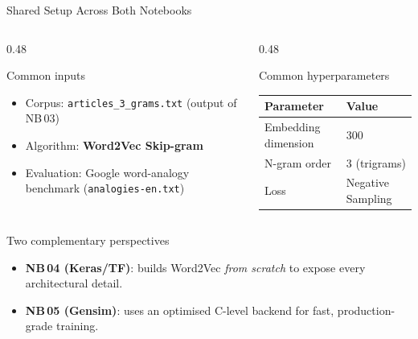 \documentclass[11pt,aspectratio=169,professionalfonts]{beamer}
\begin{document}
\begin{frame}{Shared Setup Across Both Notebooks}

  \begin{columns}[T]
    \begin{column}{0.48\textwidth}
      \begin{block}{Common inputs}
        \begin{itemize}
          \item Corpus: \texttt{articles\_3\_grams.txt}
                (output of NB\,03)
          \item Algorithm: \textbf{Word2Vec Skip-gram}
          \item Evaluation: Google word-analogy benchmark
                (\texttt{analogies-en.txt})
        \end{itemize}
      \end{block}
    \end{column}
    \begin{column}{0.48\textwidth}
      \begin{block}{Common hyperparameters}
        \begin{tabular}{|l|l|}
          \hline
          \textbf{Parameter} & \textbf{Value} \\
          \hline
          Embedding dimension & 300 \\
          N-gram order        & 3 (trigrams) \\
          Loss                & Negative Sampling \\
          \hline
        \end{tabular}
      \end{block}
    \end{column}
  \end{columns}

  \vspace{0.8em}
  \begin{block}{Two complementary perspectives}
    \begin{itemize}
      \item \textbf{NB\,04 (Keras/TF)}: builds Word2Vec \emph{from scratch}
            to expose every architectural detail.
      \item \textbf{NB\,05 (Gensim)}: uses an optimised C-level backend
            for fast, production-grade training.
    \end{itemize}
  \end{block}

\end{frame}
%
\end{document}
